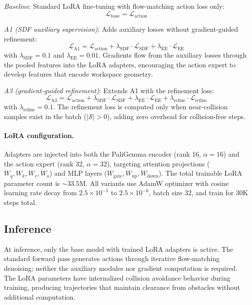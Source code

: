 \textit{Baseline}: Standard LoRA fine-tuning with flow-matching action loss only:
\begin{equation}
\mathcal{L}_\mathrm{base} = \mathcal{L}_\mathrm{action}
\end{equation}

\textit{A1 (SDF auxiliary supervision)}: Adds auxiliary losses without gradient-guided refinement:
\begin{equation}\label{eq:loss_a1}
\mathcal{L}_\mathrm{A1} = \mathcal{L}_\mathrm{action} + \lambda_\mathrm{SDF} \cdot \mathcal{L}_\mathrm{SDF} + \lambda_\mathrm{EE} \cdot \mathcal{L}_\mathrm{EE}
\end{equation}
with $\lambda_\mathrm{SDF} = 0.1$ and $\lambda_\mathrm{EE} = 0.01$. Gradients flow from the auxiliary losses through the pooled features into the LoRA adapters, encouraging the action expert to develop features that encode workspace geometry.

\textit{A3 (gradient-guided refinement)}: Extends A1 with the refinement loss:
\begin{equation}\label{eq:loss_a3}
\mathcal{L}_\mathrm{A3} = \mathcal{L}_\mathrm{action} + \lambda_\mathrm{SDF} \cdot \mathcal{L}_\mathrm{SDF} + \lambda_\mathrm{EE} \cdot \mathcal{L}_\mathrm{EE} + \lambda_\mathrm{refine} \cdot \mathcal{L}_\mathrm{refine}
\end{equation}
with $\lambda_\mathrm{refine} = 0.1$. The refinement loss is computed only when near-collision samples exist in the batch ($|\mathcal{S}| > 0$), adding zero overhead for collision-free steps.

\paragraph{LoRA configuration.} Adapters are injected into both the PaliGemma encoder (rank 16, $\alpha = 16$) and the action expert (rank 32, $\alpha = 32$), targeting attention projections ($W_q, W_k, W_v, W_o$) and MLP layers ($W_\mathrm{gate}, W_\mathrm{up}, W_\mathrm{down}$). The total trainable LoRA parameter count is ${\sim}$33.5M. All variants use AdamW optimizer with cosine learning rate decay from $2.5 \times 10^{-5}$ to $2.5 \times 10^{-6}$, batch size 32, and train for 30K steps total.

\subsection{Inference}\label{sec:inference}

At inference, only the base model with trained LoRA adapters is active. The standard forward pass generates actions through iterative flow-matching denoising; neither the auxiliary modules nor gradient computation is required. The LoRA parameters have internalized collision avoidance behavior during training, producing trajectories that maintain clearance from obstacles without additional computation.

